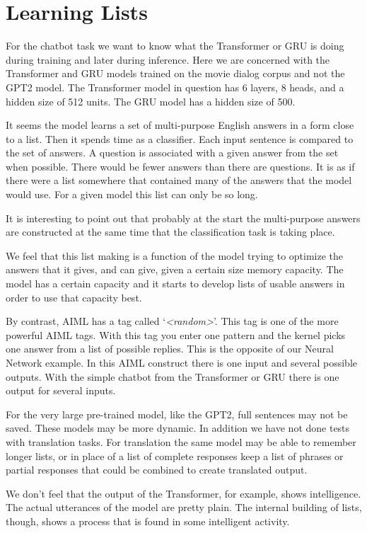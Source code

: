 \section{Learning Lists}

For the chatbot task we want to know what the Transformer or GRU is doing during training and later during inference. Here we are concerned with the Transformer and GRU models trained on the movie dialog corpus and not the GPT2 model. The Transformer model in question has 6 layers, 8 heads, and a hidden size of 512 units. The GRU model has a hidden size of 500.

It seems the model learns a set of multi-purpose English answers in a form close to a list. Then it spends time as a classifier. Each input sentence is compared to the set of answers. A question is associated with a given answer from the set when possible. There would be fewer answers than there are questions. It is as if there were a list somewhere that contained many of the answers that the model would use. For a given model this list can only be so long.

It is interesting to point out that probably at the start the multi-purpose answers are constructed at the same time that the classification task is taking place. 

We feel that this list making is a function of the model trying to optimize the answers that it gives, and can give, given a certain size memory capacity. The model has a certain capacity and it starts to develop lists of usable answers in order to use that capacity best.

By contrast, AIML has a tag called `\textit{<random>}'. This tag is one of the more powerful AIML tags. With this tag you enter one pattern and the kernel picks one answer from a list of possible replies. This is the opposite of our Neural Network example. In this AIML construct there is one input and several possible outputs. With the simple chatbot from the Transformer or GRU there is one output for several inputs.

For the very large pre-trained model, like the GPT2, full sentences may not be saved. These models may be more dynamic. In addition we have not done tests with translation tasks. For translation the same model may be able to remember longer lists, or in place of a list of complete responses keep a list of phrases or partial responses that could be combined to create translated output.

We don't feel that the output of the Transformer, for example, shows intelligence. The actual utterances of the model are pretty plain. The internal building of lists, though, shows a process that is found in some intelligent activity.